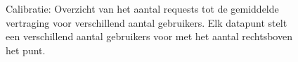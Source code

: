 \begin{figure}[h!] 
\centering
	\caption{Calibratie: Overzicht van het aantal requests tot de gemiddelde vertraging voor verschillend aantal gebruikers. Elk datapunt stelt een verschillend aantal gebruikers voor met het aantal rechtsboven het punt. }
	\label{fig:calibratie-gebruikers-resultaat}
\end{figure}

